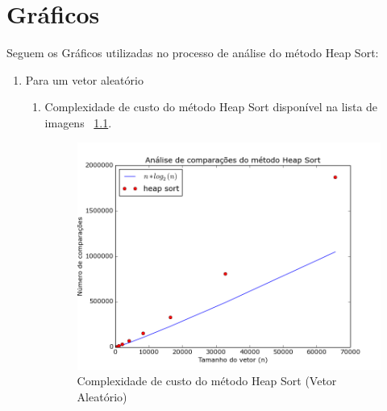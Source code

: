 \documentclass[12pt,a4paper,twoside]{report}
\begin{document}
\chapter{Gráficos}

Seguem os Gráficos utilizadas no processo de análise do método Heap Sort:
\begin{enumerate}

	\item Para um vetor aleatório
	\begin{enumerate}
		\item Complexidade de custo do método Heap Sort disponível na lista de imagens ~\ref{fig:HeapPlot1A}.
		\begin{figure}[!h]
			\centering
			\includegraphics[scale=0.6]{../imagens/Heap/heap_plot_1_aleatorio.png}
			\caption{Complexidade de custo do método Heap Sort (Vetor Aleatório) \label{fig:HeapPlot1A}}
		\end{figure}
		
		
	

\end{enumerate}
\end{enumerate}
\end{document}
